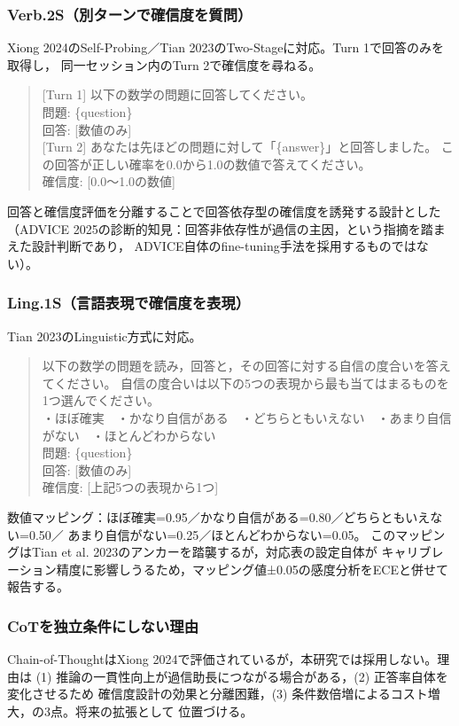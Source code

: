 \documentclass[11pt,a4paper,oneside]{article}
\begin{document}
\subsubsection*{Verb.2S（別ターンで確信度を質問）}
Xiong 2024のSelf-Probing／Tian 2023のTwo-Stageに対応。Turn 1で回答のみを取得し，
同一セッション内のTurn 2で確信度を尋ねる。
\begin{quote}\ttfamily\small
[Turn 1] 以下の数学の問題に回答してください。\\
問題: \{question\}\\
回答: [数値のみ]\\[0.5em]
[Turn 2] あなたは先ほどの問題に対して「\{answer\}」と回答しました。
この回答が正しい確率を0.0から1.0の数値で答えてください。\\
確信度: [0.0〜1.0の数値]
\end{quote}
回答と確信度評価を分離することで回答依存型の確信度を誘発する設計とした
（ADVICE 2025の診断的知見：回答非依存性が過信の主因，という指摘を踏まえた設計判断であり，
ADVICE自体のfine-tuning手法を採用するものではない）。

\subsubsection*{Ling.1S（言語表現で確信度を表現）}
Tian 2023のLinguistic方式に対応。
\begin{quote}\ttfamily\small
以下の数学の問題を読み，回答と，その回答に対する自信の度合いを答えてください。
自信の度合いは以下の5つの表現から最も当てはまるものを1つ選んでください。\\
・ほぼ確実　・かなり自信がある　・どちらともいえない　・あまり自信がない　・ほとんどわからない\\
問題: \{question\}\\
回答: [数値のみ]\\
確信度: [上記5つの表現から1つ]
\end{quote}

数値マッピング：ほぼ確実=0.95／かなり自信がある=0.80／どちらともいえない=0.50／
あまり自信がない=0.25／ほとんどわからない=0.05。
このマッピングはTian et al. 2023のアンカーを踏襲するが，対応表の設定自体が
キャリブレーション精度に影響しうるため，マッピング値±0.05の感度分析をECEと併せて報告する。

\subsubsection*{CoTを独立条件にしない理由}
Chain-of-ThoughtはXiong 2024で評価されているが，本研究では採用しない。理由は
(1) 推論の一貫性向上が過信助長につながる場合がある，(2) 正答率自体を変化させるため
確信度設計の効果と分離困難，(3) 条件数倍増によるコスト増大，の3点。将来の拡張として
位置づける。
\end{document}
